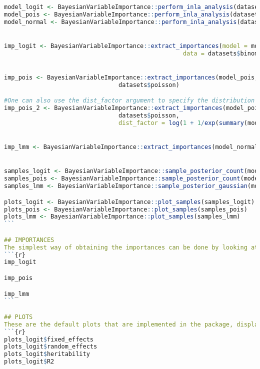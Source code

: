 \begin{lstlisting}[language=R, caption=Usage of the BayesianImpGLMM package with plots and examples.]
model_logit <- BayesianVariableImportance::perform_inla_analysis(datasets$binomial_logit, glmm_logit, family = "binomial", link_func = "logit")
model_pois <- BayesianVariableImportance::perform_inla_analysis(datasets$poisson, glmm_pois, family = "poisson", link_func = "log")
model_normal <- BayesianVariableImportance::perform_inla_analysis(datasets$normal, lmm, family = "gaussian", link_func = "identity")


imp_logit <- BayesianVariableImportance::extract_importances(model = model_logit, 
                                                  data = datasets$binomial_logit)


imp_pois <- BayesianVariableImportance::extract_importances(model_pois, 
                                datasets$poisson)

#One can also use the dist_factor argument to specify the distribution factor one wishes to use
imp_pois_2 <- BayesianVariableImportance::extract_importances(model_pois, 
                                datasets$poisson,
                                dist_factor = log(1 + 1/exp(summary(model_pois)$fixed[1] + 0.5)))


imp_lmm <- BayesianVariableImportance::extract_importances(model_normal, datasets$normal)


samples_logit <- BayesianVariableImportance::sample_posterior_count(model_logit, glmm_logit, datasets$binomial_logit, n_samp=5000, additive_param = "Z1")
samples_pois <- BayesianVariableImportance::sample_posterior_count(model_pois, glmm_pois, datasets$poisson, n_samp=5000, additive_param = "Z1")
samples_lmm <- BayesianVariableImportance::sample_posterior_gaussian(model_normal, lmm, datasets$normal, n_samp=5000, additive_param = "Z1")

plots_logit <- BayesianVariableImportance::plot_samples(samples_logit)
plots_pois <- BayesianVariableImportance::plot_samples(samples_pois)
plots_lmm <- BayesianVariableImportance::plot_samples(samples_lmm)
```

## IMPORTANCES
The simplest way of obtaining the importances can be done by looking at these objects. Note that these are sampled, so they do not represent the mean of the samples used for plotting further down.
```{r}
imp_logit

imp_pois

imp_lmm
```

## PLOTS
These are the default plots that are implemented in the package, displaying the importance of all effects and $R^2$ metrics.
```{r}
plots_logit$fixed_effects
plots_logit$random_effects
plots_logit$heritability
plots_logit$R2


\end{lstlisting}
